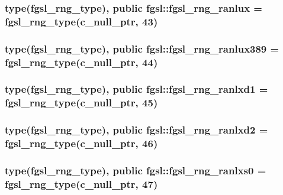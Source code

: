 \hypertarget{classfgsl_a52505d0b341c829d785f2a0005575a40}{
\subsubsection[{fgsl\-\_\-rng\-\_\-ranlux}]{\setlength{\rightskip}{0pt plus 5cm}type({\bf fgsl\-\_\-rng\-\_\-type}), public fgsl\-::fgsl\-\_\-rng\-\_\-ranlux = {\bf fgsl\-\_\-rng\-\_\-type}(c\-\_\-null\-\_\-ptr, 43)}}\label{classfgsl_a52505d0b341c829d785f2a0005575a40}
\hypertarget{classfgsl_a1403f9766b272caac077f138b24156ba}{
\subsubsection[{fgsl\-\_\-rng\-\_\-ranlux389}]{\setlength{\rightskip}{0pt plus 5cm}type({\bf fgsl\-\_\-rng\-\_\-type}), public fgsl\-::fgsl\-\_\-rng\-\_\-ranlux389 = {\bf fgsl\-\_\-rng\-\_\-type}(c\-\_\-null\-\_\-ptr, 44)}}\label{classfgsl_a1403f9766b272caac077f138b24156ba}
\hypertarget{classfgsl_a524c5eebeb98cf095b5bfe9bde105de5}{
\subsubsection[{fgsl\-\_\-rng\-\_\-ranlxd1}]{\setlength{\rightskip}{0pt plus 5cm}type({\bf fgsl\-\_\-rng\-\_\-type}), public fgsl\-::fgsl\-\_\-rng\-\_\-ranlxd1 = {\bf fgsl\-\_\-rng\-\_\-type}(c\-\_\-null\-\_\-ptr, 45)}}\label{classfgsl_a524c5eebeb98cf095b5bfe9bde105de5}
\hypertarget{classfgsl_ab9c54c86c74196b01b8038402c43038a}{
\subsubsection[{fgsl\-\_\-rng\-\_\-ranlxd2}]{\setlength{\rightskip}{0pt plus 5cm}type({\bf fgsl\-\_\-rng\-\_\-type}), public fgsl\-::fgsl\-\_\-rng\-\_\-ranlxd2 = {\bf fgsl\-\_\-rng\-\_\-type}(c\-\_\-null\-\_\-ptr, 46)}}\label{classfgsl_ab9c54c86c74196b01b8038402c43038a}
\hypertarget{classfgsl_a7114194063748411f9f00507745269fa}{
\subsubsection[{fgsl\-\_\-rng\-\_\-ranlxs0}]{\setlength{\rightskip}{0pt plus 5cm}type({\bf fgsl\-\_\-rng\-\_\-type}), public fgsl\-::fgsl\-\_\-rng\-\_\-ranlxs0 = {\bf fgsl\-\_\-rng\-\_\-type}(c\-\_\-null\-\_\-ptr, 47)}}\label{classfgsl_a7114194063748411f9f00507745269fa}
